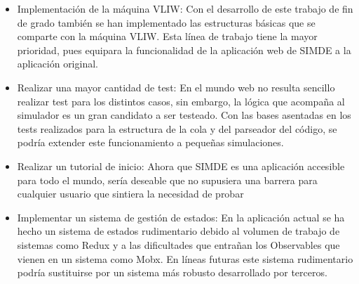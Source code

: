 \begin{itemize}

\item Implementación de la máquina VLIW: Con el desarrollo de este trabajo de fin de grado también se han implementado las estructuras básicas que se comparte con la máquina 
VLIW. Esta línea de trabajo tiene la mayor prioridad, pues equipara la funcionalidad de la aplicación web de 
SIMDE a la aplicación original.

\item Realizar una mayor cantidad de test: En el mundo web no resulta sencillo realizar test 
para los distintos casos, sin embargo, la lógica que acompaña al simulador es un gran candidato a 
ser testeado. Con las bases asentadas en los tests realizados para la estructura de la cola y 
del parseador del código, se podría extender este funcionamiento a pequeñas simulaciones.

\item Realizar un tutorial de inicio: Ahora que SIMDE es una aplicación accesible para todo el mundo, sería
deseable que no supusiera una barrera para cualquier usuario que sintiera la necesidad de probar 

\item Implementar un sistema de gestión de estados: En la aplicación actual se ha hecho un sistema
 de estados rudimentario debido al volumen de trabajo de sistemas como Redux y a las dificultades 
 que entrañan los Observables que vienen en un sistema como Mobx. En líneas futuras este sistema
  rudimentario podría sustituirse por un sistema más robusto desarrollado por terceros.

\end{itemize}